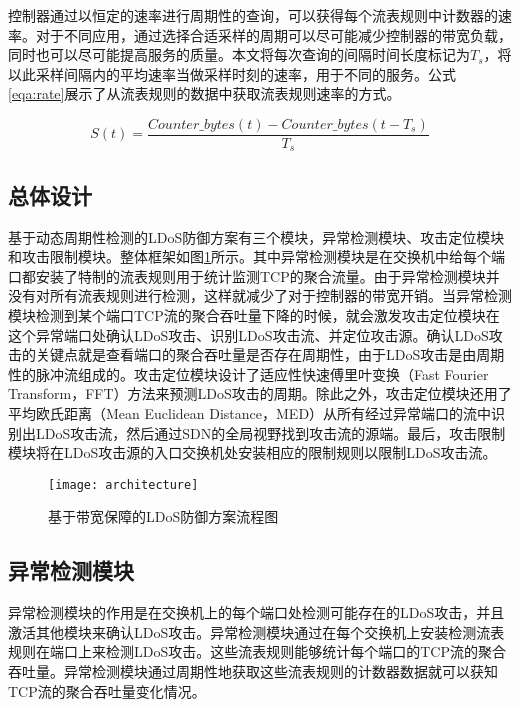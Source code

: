 控制器通过以恒定的速率进行周期性的查询，可以获得每个流表规则中计数器的速率。对于不同应用，通过选择合适采样的周期可以尽可能减少控制器的带宽负载，同时也可以尽可能提高服务的质量。本文将每次查询的间隔时间长度标记为$T_s$，将以此采样间隔内的平均速率当做采样时刻的速率，用于不同的服务。公式\ref{eqa:rate}展示了从流表规则的数据中获取流表规则速率的方式。

\begin{equation}
	\label{eqa:rate}
	S(t) = \frac{Counter\_bytes(t) - Counter\_bytes(t - T_s)}{T_s}
\end{equation}

\subsection{总体设计}
\label{chap4:overview}

基于动态周期性检测的LDoS防御方案有三个模块，异常检测模块、攻击定位模块和攻击限制模块。整体框架如图\ref{fig:architecture}所示。其中异常检测模块是在交换机中给每个端口都安装了特制的流表规则用于统计监测TCP的聚合流量。由于异常检测模块并没有对所有流表规则进行检测，这样就减少了对于控制器的带宽开销。当异常检测模块检测到某个端口TCP流的聚合吞吐量下降的时候，就会激发攻击定位模块在这个异常端口处确认LDoS攻击、识别LDoS攻击流、并定位攻击源。确认LDoS攻击的关键点就是查看端口的聚合吞吐量是否存在周期性，由于LDoS攻击是由周期性的脉冲流组成的。攻击定位模块设计了适应性快速傅里叶变换（Fast Fourier Transform，FFT）方法来预测LDoS攻击的周期。除此之外，攻击定位模块还用了平均欧氏距离（Mean Euclidean Distance，MED）从所有经过异常端口的流中识别出LDoS攻击流，然后通过SDN的全局视野找到攻击流的源端。最后，攻击限制模块将在LDoS攻击源的入口交换机处安装相应的限制规则以限制LDoS攻击流。

\begin{figure}
    \centering
    \texttt{[image: architecture]}
    \caption{基于带宽保障的LDoS防御方案流程图}
    \label{fig:architecture}
\end{figure}

\subsection{异常检测模块}
\label{chap4:Monitor}
异常检测模块的作用是在交换机上的每个端口处检测可能存在的LDoS攻击，并且激活其他模块来确认LDoS攻击。异常检测模块通过在每个交换机上安装检测流表规则在端口上来检测LDoS攻击。这些流表规则能够统计每个端口的TCP流的聚合吞吐量。异常检测模块通过周期性地获取这些流表规则的计数器数据就可以获知TCP流的聚合吞吐量变化情况。

